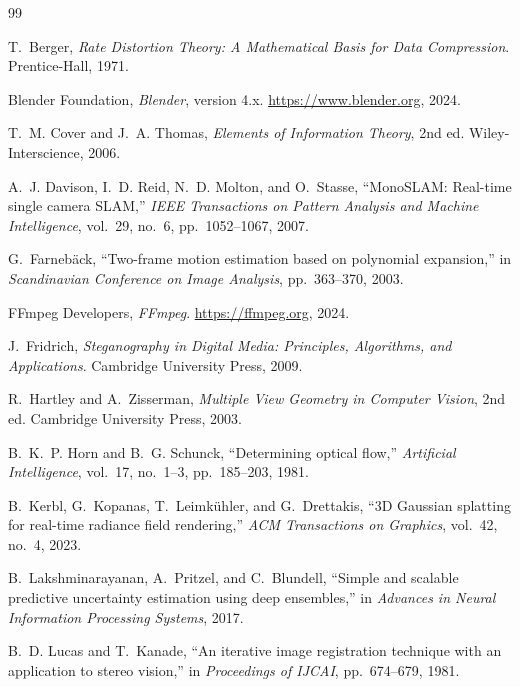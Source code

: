 \documentclass[11pt,a4paper]{article}
\theoremstyle{plain}
\theoremstyle{definition}
\theoremstyle{remark}
\begin{document}
\begin{thebibliography}{99}

T.~Berger, \textit{Rate Distortion Theory: A Mathematical Basis for Data Compression}. Prentice-Hall, 1971.

Blender Foundation, \textit{Blender}, version 4.x. \url{https://www.blender.org}, 2024.

T.~M. Cover and J.~A. Thomas, \textit{Elements of Information Theory}, 2nd ed. Wiley-Interscience, 2006.

A.~J. Davison, I.~D. Reid, N.~D. Molton, and O.~Stasse, ``MonoSLAM: Real-time single camera SLAM,'' \textit{IEEE Transactions on Pattern Analysis and Machine Intelligence}, vol.~29, no.~6, pp.~1052--1067, 2007.

G.~Farneb{\"a}ck, ``Two-frame motion estimation based on polynomial expansion,'' in \textit{Scandinavian Conference on Image Analysis}, pp.~363--370, 2003.

FFmpeg Developers, \textit{FFmpeg}. \url{https://ffmpeg.org}, 2024.

J.~Fridrich, \textit{Steganography in Digital Media: Principles, Algorithms, and Applications}. Cambridge University Press, 2009.

R.~Hartley and A.~Zisserman, \textit{Multiple View Geometry in Computer Vision}, 2nd ed. Cambridge University Press, 2003.

B.~K.~P. Horn and B.~G. Schunck, ``Determining optical flow,'' \textit{Artificial Intelligence}, vol.~17, no.~1--3, pp.~185--203, 1981.

B.~Kerbl, G.~Kopanas, T.~Leimk{\"u}hler, and G.~Drettakis, ``3D Gaussian splatting for real-time radiance field rendering,'' \textit{ACM Transactions on Graphics}, vol.~42, no.~4, 2023.

B.~Lakshminarayanan, A.~Pritzel, and C.~Blundell, ``Simple and scalable predictive uncertainty estimation using deep ensembles,'' in \textit{Advances in Neural Information Processing Systems}, 2017.

B.~D. Lucas and T.~Kanade, ``An iterative image registration technique with an application to stereo vision,'' in \textit{Proceedings of IJCAI}, pp.~674--679, 1981.


\end{thebibliography}
\end{document}
